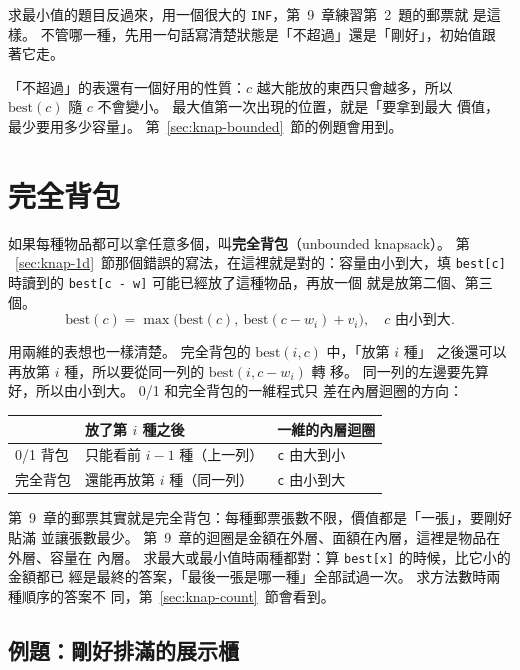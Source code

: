 求最小值的題目反過來，用一個很大的 \texttt{INF}，第~9~章練習第~2~題的郵票就
是這樣。 不管哪一種，先用一句話寫清楚狀態是「不超過」還是「剛好」，初始值跟
著它走。

「不超過」的表還有一個好用的性質：$c$ 越大能放的東西只會越多，所以
$\mathrm{best}(c)$ 隨 $c$ 不會變小。 最大值第一次出現的位置，就是「要拿到最大
價值，最少要用多少容量」。 第~\ref{sec:knap-bounded}~節的例題會用到。

\section{完全背包}
\label{sec:knap-unbounded}

如果每種物品都可以拿任意多個，叫\textbf{完全背包}（unbounded knapsack）。 第
~\ref{sec:knap-1d}~節那個錯誤的寫法，在這裡就是對的：容量由小到大，填
\texttt{best[c]} 時讀到的 \texttt{best[c - w]} 可能已經放了這種物品，再放一個
就是放第二個、第三個。
\[
\mathrm{best}(c) = \max\bigl(\mathrm{best}(c),\ \mathrm{best}(c - w_i) + v_i\bigr),
\quad c \text{ 由小到大}.
\]

用兩維的表想也一樣清楚。 完全背包的 $\mathrm{best}(i, c)$ 中，「放第 $i$ 種」
之後還可以再放第 $i$ 種，所以要從同一列的 $\mathrm{best}(i, c - w_i)$ 轉
移。 同一列的左邊要先算好，所以由小到大。 0/1 和完全背包的一維程式只
差在內層迴圈的方向：

\begin{center}
\begin{tabular}{lll}
\toprule
 & 放了第 $i$ 種之後 & 一維的內層迴圈 \\
\midrule
0/1 背包 & 只能看前 $i - 1$ 種（上一列） & \texttt{c} 由大到小 \\
完全背包 & 還能再放第 $i$ 種（同一列） & \texttt{c} 由小到大 \\
\bottomrule
\end{tabular}
\end{center}

第~9~章的郵票其實就是完全背包：每種郵票張數不限，價值都是「一張」，要剛好貼滿
並讓張數最少。 第~9~章的迴圈是金額在外層、面額在內層，這裡是物品在外層、容量在
內層。 求最大或最小值時兩種都對：算 \texttt{best[x]} 的時候，比它小的金額都已
經是最終的答案，「最後一張是哪一種」全部試過一次。 求方法數時兩種順序的答案不
同，第~\ref{sec:knap-count}~節會看到。

\subsection{例題：剛好排滿的展示櫃}
\label{sec:ex-shelf}

